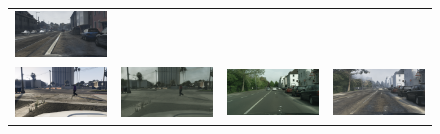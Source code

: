 \begin{figure}[h]
{\begin{tabular}{cc cc}
    \includegraphics[width=\myw, height=\myh]{figs/gta-cityscapes/fake-gta-00702-fs8.png}
   \\
    \includegraphics[width=\myw, height=\myh]{figs/gta-cityscapes/gta-01490-fs8.png} &
    \includegraphics[width=\myw, height=\myh]{figs/gta-cityscapes/fake-cityscapes-01490-fs8.png} &
    \includegraphics[width=\myw, height=\myh]{figs/gta-cityscapes/cityscapes-01490-fs8.png} &
    \includegraphics[width=\myw, height=\myh]{figs/gta-cityscapes/fake-gta-01490-fs8.png}

\end{tabular}}
\end{figure}
